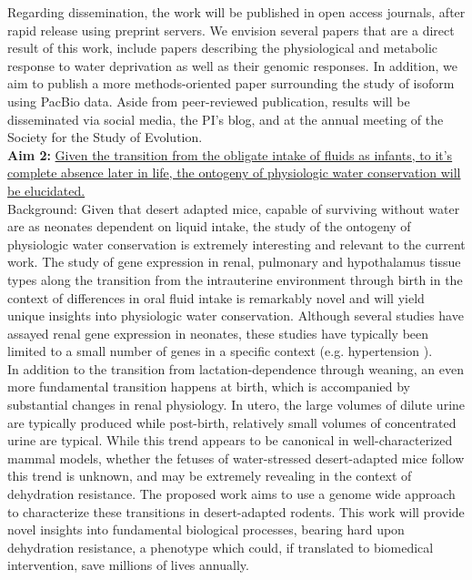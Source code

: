 \documentclass[12pt]{article}
\begin{document}
Regarding dissemination, the work will be published in open access journals, after rapid release using preprint servers. We envision several papers that are a direct result of this work, include papers describing the physiological and metabolic response to water deprivation as well as their genomic responses. In addition, we aim to publish a more methods-oriented paper surrounding the study of isoform using PacBio data. Aside from peer-reviewed publication, results will be disseminated via social media, the PI's blog, and at the annual meeting of the Society for the Study of Evolution. \\       




\noindent \textbf{Aim 2:} \ul{Given the transition from the obligate intake of fluids as infants, to it’s complete absence later in life, the ontogeny of physiologic water conservation will be elucidated.} \\

Background: Given that desert adapted mice, capable of surviving without water are as neonates dependent on liquid intake, {the study of the ontogeny of physiologic water conservation is extremely interesting and relevant to the current work.} The study of gene expression in renal, pulmonary and hypothalamus tissue types along the transition from the intrauterine environment through birth in the context of differences in oral fluid intake is remarkably novel and will yield unique insights into physiologic water conservation. Although several studies have assayed renal gene expression in neonates, these studies have typically been limited to a small number of genes in a specific context (e.g. hypertension \citep{Sampson:2012hb,Shanmugam:1996ed}). \\

In addition to the transition from lactation-dependence through weaning, an even more fundamental transition happens at birth, which is accompanied by substantial changes in renal physiology. In utero, the large volumes of dilute urine are typically produced \citep{Wintour:1997ts} while post-birth, relatively small volumes of concentrated urine are typical. While this trend appears to be canonical in well-characterized mammal models, whether the fetuses of water-stressed desert-adapted mice follow this trend is unknown, and may be extremely revealing in the context of dehydration resistance. The proposed work aims to use a genome wide approach to characterize these transitions in desert-adapted rodents. This work will provide novel insights into fundamental biological processes, bearing hard upon dehydration resistance, a phenotype which could, if translated to biomedical intervention, save millions of lives annually.  \\  
\end{document}
